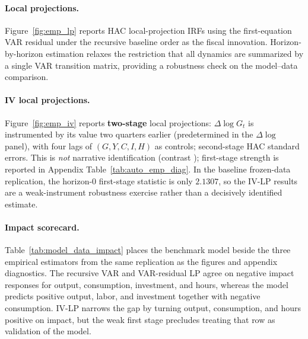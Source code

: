 \documentclass[11pt,a4paper]{article}
\begin{document}

\paragraph{Local projections.}
Figure~\ref{fig:emp_lp} reports HAC local-projection IRFs using the first-equation VAR residual under the recursive baseline order as the fiscal innovation. Horizon-by-horizon estimation relaxes the restriction that all dynamics are summarized by a single VAR transition matrix, providing a robustness check on the model--data comparison.

\paragraph{IV local projections.}
Figure~\ref{fig:emp_iv} reports \textbf{two-stage} local projections: $\Delta\log G_t$ is instrumented by its value two quarters earlier (predetermined in the $\Delta\log$ panel), with four lags of $(G,Y,C,I,H)$ as controls; second-stage HAC standard errors. This is \emph{not} narrative identification (contrast \citet{ramey2011identifying}); first-stage strength is reported in Appendix Table~\ref{tab:auto_emp_diag}. In the baseline frozen-data replication, the horizon-$0$ first-stage statistic is only $2.1307$, so the IV-LP results are a weak-instrument robustness exercise rather than a decisively identified estimate.

\paragraph{Impact scorecard.}
Table~\ref{tab:model_data_impact} places the benchmark model beside the three empirical estimators from the same replication as the figures and appendix diagnostics. The recursive VAR and VAR-residual LP agree on negative impact responses for output, consumption, investment, and hours, whereas the model predicts positive output, labor, and investment together with negative consumption. IV-LP narrows the gap by turning output, consumption, and hours positive on impact, but the weak first stage precludes treating that row as validation of the model.
\end{document}
